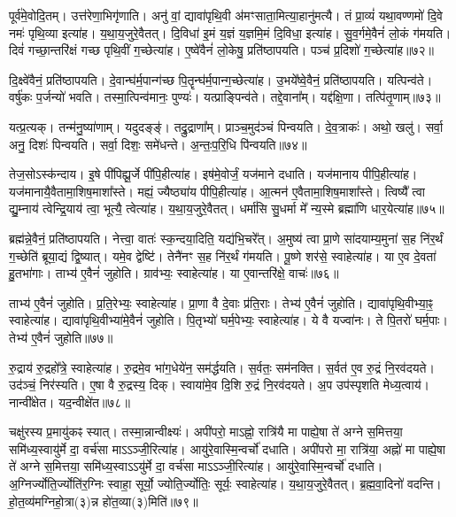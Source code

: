 पूर्व॑मे॒वोदि॒तम्। 
उत्त॑रेणा॒भिगृ॑णाति। 
अनु॑ वां॒ द्यावा॑पृथि॒वी अ॑मꣳसाता॒मित्या॒हानु॑मत्यै। 
तं प्रा॒व्यं॑ यथा॒वण्णमो॑ दि॒वे नमः॑ पृथि॒व्या इत्या॑ह। 
य॒था॒य॒जुरे॒वैतत्। 
दि॒विधा॑ इ॒मं य॒ज्ञं य॒ज्ञमि॒मं दि॒विधा॒ इत्या॑ह। 
सु॒व॒र्गमे॒वैनं॑ लो॒कं ग॑मयति। 
दिवं॑ गच्छा॒न्तरि॑क्षं गच्छ पृथि॒वीं ग॒च्छेत्या॑ह। 
ए॒ष्वे॑वैनं॑ लो॒केषु॒ प्रति॑ष्ठापयति। 
पञ्च॑ प्र॒दिशो॑ ग॒च्छेत्या॑ह॥७२॥

दि॒क्ष्वे॑वैनं॒ प्रति॑ष्ठापयति। 
दे॒वान्घ॑र्म॒पान्ग॑च्छ पि॒तॄन्घ॑र्म॒पान्ग॒च्छे\-त्या॑ह। 
उ॒भये᳚ष्वे॒वैनं॒ प्रति॑ष्ठापयति। 
यत्पिन्व॑ते। 
वर्\mbox{}षु॑कः प॒र्जन्यो॑ भवति। 
तस्मा॒त्पिन्व॑मानः॒ पुण्यः॑। 
यत्प्राङ्पिन्व॑ते। 
तद्दे॒वाना᳚म्। 
यद्द॑क्षि॒णा। 
तत्पि॑तृ॒णाम्॥७३॥

यत्प्र॒त्यक्। 
तन्म॑नु॒ष्या॑णाम्। 
यदुदङ्ङ्॑। 
तद्रु॒द्राणा᳚म्। 
प्राञ्च॒मुद॑ञ्चं पिन्वयति। 
दे॒व॒त्राकः॑। 
अथो॒ खलु॑। 
सर्वा॒ अनु॒ दिशः॑ पिन्वयति। 
सर्वा॒ दिशः॒ समे॑धन्ते। 
अ॒न्तः॒प॒रि॒धि पि॑न्वयति॥७४॥

तेज॒सोऽस्क॑न्दाय। 
इ॒षे पी॑पिह्यू॒र्जे पी॑पि॒हीत्या॑ह। 
इष॑मे॒वोर्जं॒ यज॑माने दधाति। 
यज॑मानाय पीपि॒हीत्या॑ह। 
यज॑मानायै॒वैतामा॒शिष॒माशा᳚स्ते। 
मह्यं॒ ज्यैष्ठ्या॑य पीपि॒हीत्या॑ह। 
आ॒त्मन॑ ए॒वैतामा॒शिष॒माशा᳚स्ते। 
त्विष्यै᳚ त्वा द्यु॒म्नाय॑ त्वेन्द्रि॒याय॑ त्वा॒ भूत्यै॒ त्वेत्या॑ह। 
य॒था॒य॒जुरे॒वैतत्। 
धर्मा॑सि सु॒धर्मा मे᳚ न्य॒स्मे ब्रह्मा॑णि धार॒येत्या॑ह॥७५॥

ब्रह्म॑न्ने॒वैनं॒ प्रति॑ष्ठापयति। 
नेत्त्वा॒ वातः॑ स्क॒न्दया॒दिति॒ यद्य॑भि॒चरे᳚त्। 
अ॒मुष्य॑ त्वा प्रा॒णे सा॑दयाम्य॒मुना॑ स॒ह नि॑र॒र्थं ग॒च्छेति॑ ब्रूया॒द्यं द्वि॒ष्यात्। 
यमे॒व द्वेष्टि॑। 
तेनै॑नꣳ स॒ह नि॑र॒र्थं ग॑मयति। 
पू॒ष्णे शर॑से॒ स्वाहेत्या॑ह। 
या ए॒व दे॒वता॑ हु॒तभा॑गाः। 
ताभ्य॑ ए॒वैनं॑ जुहोति। 
ग्राव॑भ्यः॒ स्वाहेत्या॑ह। 
या ए॒वान्तरि॑क्षे॒ वाचः॑॥७६॥

ताभ्य॑ ए॒वैनं॑ जुहोति। 
प्र॒ति॒रेभ्यः॒ स्वाहेत्या॑ह। 
प्रा॒णा वै दे॒वाः प्र॑ति॒राः। 
तेभ्य॑ ए॒वैनं॑ जुहोति। 
द्यावा॑पृथि॒वीभ्या॒ꣴ॒ स्वाहेत्या॑ह। 
द्यावा॑पृथि॒वीभ्या॑मे॒वैनं॑ जुहोति। 
पि॒तृभ्यो॑ घर्म॒पेभ्यः॒ स्वाहेत्या॑ह। 
ये वै यज्वा॑नः। 
ते पि॒तरो॑ घर्म॒पाः। 
तेभ्य॑ ए॒वैनं॑ जुहोति॥७७॥

रु॒द्राय॑ रु॒द्रहो᳚त्रे॒ स्वाहेत्या॑ह। 
रु॒द्रमे॒व भा॑ग॒धेये॑न॒ सम॑र्द्धयति। 
स॒र्वतः॒ सम॑नक्ति। 
स॒र्वत॑ ए॒व रु॒द्रं नि॒रव॑दयते। 
उद॑ञ्चं॒ निर॑स्यति। 
ए॒षा वै रु॒द्रस्य॒ दिक्। 
स्वाया॑मे॒व दि॒शि रु॒द्रं नि॒रव॑दयते। 
अ॒प उप॑स्पृशति मेध्य॒त्वाय॑। 
नान्वी᳚क्षेत। 
यद॒न्वीक्षे॑त॥७८॥

चक्षु॑रस्य प्र॒मायु॑कꣴ स्यात्। 
तस्मा॒न्नान्वीक्ष्यः॑। 
अपी॑परो॒ माऽह्नो॒ रात्रि॑यै मा पाह्ये॒षा ते॑ अग्ने स॒मित्तया॒ समि॑ध्य॒स्वायु॑र्मे दा॒ वर्च॑सा माऽऽञ्जी॒रित्या॑ह। 
आयु॑रे॒वास्मि॒न्वर्चो॑ दधाति। 
अपी॑परो मा॒ रात्रि॑या॒ अह्नो॑ मा पाह्ये॒षा ते॑ अग्ने स॒मित्तया॒ समि॑ध्य॒स्वाऽऽयु॑र्मे दा॒ वर्च॑सा माऽऽञ्जी॒रित्या॑ह। 
आयु॑रे॒वास्मि॒न्वर्चो॑ दधाति। 
अ॒ग्निर्ज्योति॒र्ज्योति॑र॒ग्निः स्वाहा॒ सूर्यो॒ ज्योति॒र्ज्योतिः॒ सूर्यः॒ स्वाहेत्या॑ह। 
य॒था॒य॒जुरे॒वैतत्। 
ब्र॒ह्म॒वा॒दिनो॑ वदन्ति। 
हो॒त॒व्य॑मग्निहो॒त्रा(३)न्न हो॑त॒व्या(३)मिति॑॥७९॥

